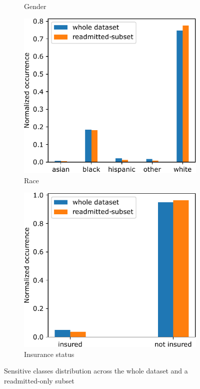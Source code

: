 \documentclass[a4paper,11pt]{article}
\begin{document}
\begin{figure}[htb]
\begin{subfigure}{0.24\textwidth}
    \caption{Gender}
    \label{fig:discrim_global_gender}
\end{subfigure}
\hfill
\begin{subfigure}{0.24\textwidth}
    \includegraphics[width=\textwidth]{images/week1_discrim_global_race.pdf}
    \caption{Race}
    \label{fig:discrim_global_race}
\end{subfigure}
\hfill
\begin{subfigure}{0.24\textwidth}
    \includegraphics[width=\textwidth]{images/week1_discrim_global_is_insured.pdf}
    \caption{Insurance status}
    \label{fig:discrim_global_is_insured}
\end{subfigure}
\caption{Sensitive classes distribution across the whole dataset and a readmitted-only subset}
\label{fig:discrim_global}
\end{figure}
\end{document}
